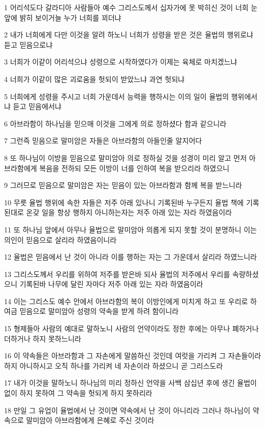 \par 1 어리석도다 갈라디아 사람들아 예수 그리스도께서 십자가에 못 박히신 것이 너희 눈앞에 밝히 보이거늘 누가 너희를 꾀더냐
\par 2 내가 너희에게 다만 이것을 알려 하노니 너희가 성령을 받은 것은 율법의 행위로냐 듣고 믿음으로냐
\par 3 너희가 이같이 어리석으냐 성령으로 시작하였다가 이제는 육체로 마치겠느냐
\par 4 너희가 이같이 많은 괴로움을 헛되이 받았느냐 과연 헛되냐
\par 5 너희에게 성령을 주시고 너희 가운데서 능력을 행하시는 이의 일이 율법의 행위에서냐 듣고 믿음에서냐
\par 6 아브라함이 하나님을 믿으매 이것을 그에게 의로 정하셨다 함과 같으니라
\par 7 그런즉 믿음으로 말미암은 자들은 아브라함의 아들인줄 알지어다
\par 8 또 하나님이 이방을 믿음으로 말미암아 의로 정하실 것을 성경이 미리 알고 먼저 아브라함에게 복음을 전하되 모든 이방이 너를 인하여 복을 받으리라 하였으니
\par 9 그러므로 믿음으로 말미암은 자는 믿음이 있는 아브라함과 함께 복을 받느니라
\par 10 무릇 율법 행위에 속한 자들은 저주 아래 있나니 기록된바 누구든지 율법 책에 기록된대로 온갖 일을 항상 행하지 아니하는자는 저주 아래 있는 자라 하였음이라
\par 11 또 하나님 앞에서 아무나 율법으로 말미암아 의롭게 되지 못할 것이 분명하니 이는 의인이 믿음으로 살리라 하였음이니라
\par 12 율법은 믿음에서 난 것이 아니라 이를 행하는 자는 그 가운데서 살리라 하였느니라
\par 13 그리스도께서 우리를 위하여 저주를 받은바 되사 율법의 저주에서 우리를 속량하셨으니 기록된바 나무에 달린 자마다 저주 아래 있는 자라 하였음이라
\par 14 이는 그리스도 예수 안에서 아브라함의 복이 이방인에게 미치게 하고 또 우리로 하여금 믿음으로 말미암아 성령의 약속을 받게 하려 함이니라
\par 15 형제들아 사람의 예대로 말하노니 사람의 언약이라도 정한 후에는 아무나 폐하거나 더하거나 하지 못하느니라
\par 16 이 약속들은 아브라함과 그 자손에게 말씀하신 것인데 여럿을 가리켜 그 자손들이라 하지 아니하시고 오직 하나를 가리켜 네 자손이라 하셨으니 곧 그리스도라
\par 17 내가 이것을 말하노니 하나님의 미리 정하신 언약을 사백 삼십년 후에 생긴 율법이 없이 하지 못하여 그 약속을 헛되게 하지 못하리라
\par 18 만일 그 유업이 율법에서 난 것이면 약속에서 난 것이 아니리라 그러나 하나님이 약속으로 말미암아 아브라함에게 은혜로 주신 것이라
